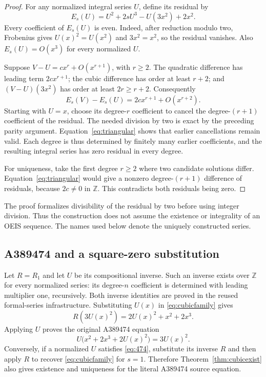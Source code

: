 \documentclass[11pt,a4paper]{article}
\theoremstyle{remark}
\newcommand{\Z}{\mathbb Z}
\begin{document}
\begin{proof}
For any normalized integral series $U$, define its residual by
\[
E_s(U)=U^2+2sU^3-U(3x^2)+2x^2.
\]
Every coefficient of $E_s(U)$ is even. Indeed, after reduction modulo
two, Frobenius gives $U(x)^2=U(x^2)$ and $3x^2=x^2$, so the residual
vanishes. Also $E_s(U)=O(x^3)$ for every normalized $U$.

Suppose $V-U=cx^r+O(x^{r+1})$, with $r\ge2$. The quadratic difference
has leading term $2cx^{r+1}$; the cubic difference has order at least
$r+2$; and $(V-U)(3x^2)$ has order at least $2r\ge r+2$.
Consequently
\begin{equation}\label{eq:triangular}
E_s(V)-E_s(U)=2cx^{r+1}+O(x^{r+2}).
\end{equation}
Starting with $U=x$, choose its degree-$r$ coefficient to cancel the
degree-$(r+1)$ coefficient of the residual. The needed division by two
is exact by the preceding parity argument. Equation~\eqref{eq:triangular}
shows that earlier cancellations remain valid. Each degree is thus
determined by finitely many earlier coefficients, and the resulting
integral series has zero residual in every degree.

For uniqueness, take the first degree $r\ge2$ where two candidate
solutions differ. Equation~\eqref{eq:triangular} would give a nonzero
degree-$(r+1)$ difference of residuals, because $2c\ne0$ in $\Z$.
This contradicts both residuals being zero.
\end{proof}

The proof formalizes divisibility of the residual by two before using
integer division. Thus the construction does not assume the existence
or integrality of an OEIS sequence. The names used below denote the
uniquely constructed series.

\subsection{A389474 and a square-zero substitution}

Let $R=R_1$ and let $U$ be its compositional inverse. Such an inverse
exists over $\Z$ for every normalized series: its degree-$n$ coefficient
is determined with leading multiplier one, recursively. Both inverse
identities are proved in the reused formal-series infrastructure.
Substituting $U(x)$ in \eqref{eq:cubicfamily} gives
\[
R(3U(x)^2)=2U(x)^2+x^2+2x^3.
\]
Applying $U$ proves the original A389474 equation
\begin{equation}\label{eq:474}
U\bigl(x^2+2x^3+2U(x)^2\bigr)=3U(x)^2.
\end{equation}
Conversely, if a normalized $U$ satisfies \eqref{eq:474}, substitute its
inverse $R$ and then apply $R$ to recover \eqref{eq:cubicfamily} for
$s=1$. Therefore Theorem~\ref{thm:cubicexist} also gives existence and
uniqueness for the literal A389474 source equation.
\end{document}
